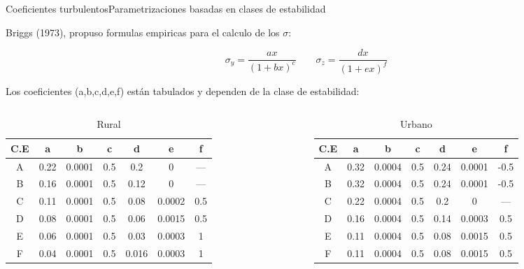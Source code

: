  
 
 \begin{frame}{Coeficientes turbulentos}{Parametrizaciones basadas en clases de estabilidad}
  
 Briggs (1973), propuso formulas empiricas para el calculo de los $\sigma$:
  
 $$
 \sigma_y =\dfrac{a x}{(1+bx)^c}
 \qquad
 \sigma_z =\dfrac{d x}{(1+ex)^f}
 $$
  
 Los coeficientes (a,b,c,d,e,f) están tabulados y dependen de la clase de estabilidad:
  
{\tiny
 \begin{columns}[t]

 
 \begin{table}
     \centering
 \begin{tabular}{| c | c c  c | c c c |}
 \hline
 C.E&    a &    b   &    c &     d &   e    & f  \\\hline
  A & 0.22 & 0.0001 &  0.5 & 0.2   & 0      & —  \\     
  B & 0.16 & 0.0001 &  0.5 & 0.12  & 0      & —  \\
  C & 0.11 & 0.0001 &  0.5 & 0.08  & 0.0002 & 0.5\\
  D & 0.08 & 0.0001 &  0.5 & 0.06  & 0.0015 & 0.5\\
  E & 0.06 & 0.0001 &  0.5 & 0.03  & 0.0003 & 1  \\
  F & 0.04 & 0.0001 &  0.5 & 0.016 & 0.0003 & 1  \\ \hline
 \end{tabular}
     \caption{Rural}
 \end{table}
  
 
 \begin{table}
     \centering
 \begin{tabular}{| c | c c  c | c c c |}
 \hline
 C.E& a & b & c & d & e & f  \\\hline
 A   & 0.32 & 0.0004 & 0.5 & 0.24  & 0.0001  & -0.5 \\
 B   & 0.32 & 0.0004 & 0.5 & 0.24  & 0.0001  & -0.5 \\
 C   & 0.22 & 0.0004 & 0.5 & 0.2   & 0       & —    \\
 D   & 0.16 & 0.0004 & 0.5 & 0.14  & 0.0003  & 0.5  \\
 E   & 0.11 & 0.0004 & 0.5 & 0.08  & 0.0015  & 0.5  \\ 
 F   & 0.11 & 0.0004 & 0.5 & 0.08  & 0.0015  & 0.5  \\ \hline
 \end{tabular}
     \caption{Urbano}
 \end{table}
 \end{columns}
 } %
 \end{frame}
  

